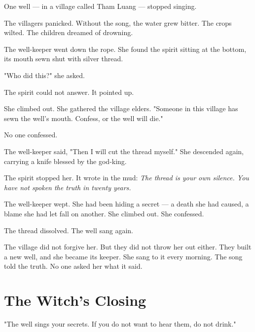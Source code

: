 \documentclass[10pt,twoside]{book}
\begin{document}
One well --- in a village called Tham Luang --- stopped singing.

The villagers panicked. Without the song, the water grew bitter. The crops wilted. The children dreamed of drowning.

The well-keeper went down the rope. She found the spirit sitting at the bottom, its mouth sewn shut with silver thread.

"Who did this?" she asked.

The spirit could not answer. It pointed up.

She climbed out. She gathered the village elders. "Someone in this village has sewn the well's mouth. Confess, or the well will die."

No one confessed.

The well-keeper said, "Then I will cut the thread myself." She descended again, carrying a knife blessed by the god-king.

The spirit stopped her. It wrote in the mud: \textit{The thread is your own silence. You have not spoken the truth in twenty years.}

The well-keeper wept. She had been hiding a secret --- a death she had caused, a blame she had let fall on another. She climbed out. She confessed.

The thread dissolved. The well sang again.

The village did not forgive her. But they did not throw her out either. They built a new well, and she became its keeper. She sang to it every morning. The song told the truth. No one asked her what it said.

\section*{The Witch's Closing}
"The well sings your secrets. If you do not want to hear them, do not drink."
\end{document}
